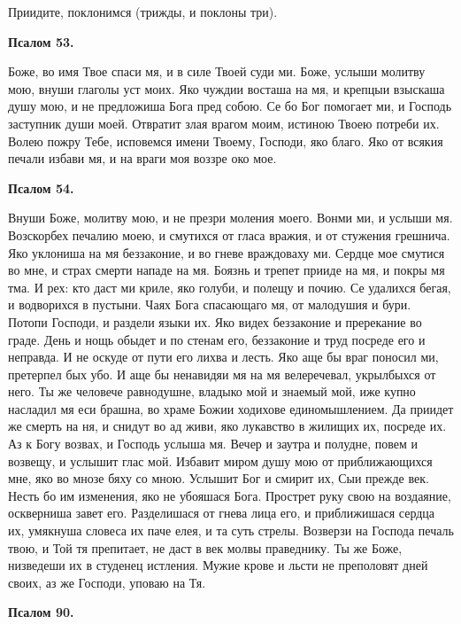 Приидите, поклонимся (трижды, и поклоны три).


\medskip


\bfseries Псалом 53.\normalfont{}


Боже, во имя Твое спаси мя, и в силе Твоей суди ми. Боже, услыши молитву мою, внуши глаголы уст моих. Яко чуждии восташа на мя, и крепцыи взыскаша душу мою, и не предложиша Бога пред собою. Се бо Бог помогает ми, и Господь заступник души моей. Отвратит злая врагом моим, истиною Твоею потреби их. Волею пожру Тебе, исповемся имени Твоему, Господи, яко благо. Яко от всякия печали избави мя, и на враги моя воззре око мое.


\medskip


\bfseries Псалом 54.\normalfont{}


Внуши Боже, молитву мою, и не презри моления моего. Вонми ми, и услыши мя. Возскорбех печалию моею, и смутихся от гласа вражия, и от стужения грешнича. Яко уклониша на мя беззаконие, и во гневе враждоваху ми. Сердце мое смутися во мне, и страх смерти нападе на мя. Боязнь и трепет прииде на мя, и покры мя тма. И рех: кто даст ми криле, яко голуби, и полещу и почию. Се удалихся бегая, и водворихся в пустыни. Чаях Бога спасающаго мя, от малодушия и бури. Потопи Господи, и раздели языки их. Яко видех беззаконие и пререкание во граде. День и нощь обыдет и по стенам его, беззаконие и труд посреде его и неправда. И не оскуде от пути его лихва и лесть. Яко аще бы враг поносил ми, претерпел бых убо. И аще бы ненавидяи мя на мя велеречевал, укрылбыхся от него. Ты же человече равнодушне, владыко мой и знаемый мой, иже купно насладил мя еси брашна, во храме Божии ходихове единомышлением. Да приидет же смерть на ня, и снидут во ад живи, яко лукавство в жилищих их, посреде их. Аз к Богу возвах, и Господь услыша мя. Вечер и заутра и полудне, повем и возвещу, и услышит глас мой. Избавит миром душу мою от приближающихся мне, яко во мнозе бяху со мною. Услышит Бог и смирит их, Сыи прежде век. Несть бо им изменения, яко не убояшася Бога. Прострет руку свою на воздаяние, оскверниша завет его. Разделишася от гнева лица его, и приближишася сердца их, умякнуша словеса их паче елея, и та суть стрелы. Возверзи на Господа печаль твою, и Той тя препитает, не даст в век молвы праведнику. Ты же Боже, низведеши их в студенец истления. Мужие крове и льсти не преполовят дней своих, аз же Господи, уповаю на Тя.


\medskip


\bfseries Псалом 90. \normalfont{}


